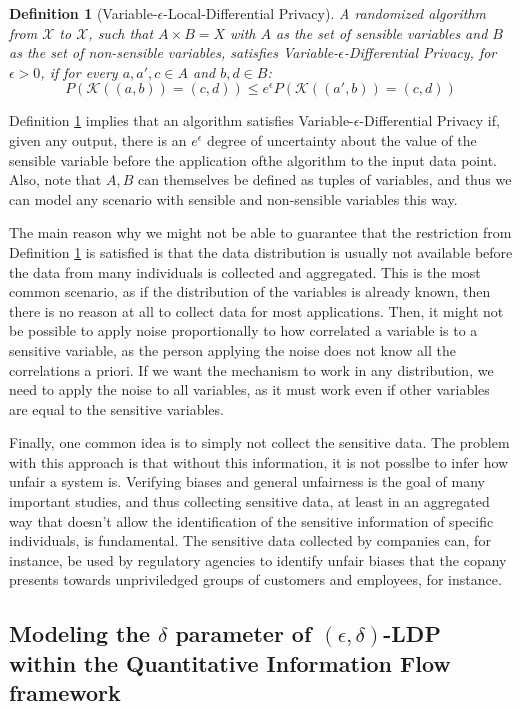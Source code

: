 \documentclass[conference]{IEEEtran}
\newtheorem{definition}{Definition}
\begin{document}
\begin{definition}[Variable-$\epsilon$-Local-Differential Privacy]\label{def:veldp} A randomized algorithm from $\mathcal{X}$ to $\mathcal{X}$, such that $A\times B = X$ with $A$ as the set of sensible variables and $B$ as the set of non-sensible variables, satisfies Variable-$\epsilon$-Differential Privacy, for $\epsilon > 0$, if for every $a, a', c \in A$ and $b, d \in B$:
$$P(\mathcal{K}((a,b)) = (c,d)) \leq e^\epsilon P(\mathcal{K}((a',b)) = (c,d))$$
\end{definition}

Definition \ref{def:veldp} implies that an algorithm satisfies Variable-$\epsilon$-Differential Privacy if, given any output, there is an $e^\epsilon$ degree of uncertainty about the value of the sensible variable before the application ofthe algorithm to the input data point. Also, note that $A,B$ can themselves be defined as tuples of variables, and thus we can model any scenario with sensible and non-sensible variables this way.

The main reason why we might not be able to guarantee that the restriction from Definition \ref{def:veldp} is satisfied is that the data distribution is usually not available before the data from many individuals is collected and aggregated. This is the most common scenario, as if the distribution of the variables is already known, then there is no reason at all to collect data for most applications. Then, it might not be possible to apply noise proportionally to how correlated a variable is to a sensitive variable, as the person applying the noise does not know all the correlations a priori. If we want the mechanism to work in any distribution, we need to apply the noise to all variables, as it must work even if other variables are equal to the sensitive variables.

Finally, one common idea is to simply not collect the sensitive data. The problem with this approach is that without this information, it is not posslbe to infer how unfair a system is. Verifying biases and general unfairness is the goal of many important studies, and thus collecting sensitive data, at least in an aggregated way that doesn't allow the identification of the sensitive information of specific individuals, is fundamental. The sensitive data collected by companies can, for instance, be used by regulatory agencies to identify unfair biases that the copany presents towards unpriviledged groups of customers and employees, for instance.

\subsection{Modeling the $\delta$ parameter of $(\epsilon,\delta)$-LDP within the Quantitative Information Flow framework}\label{subsec:ldeltap}
\end{document}
